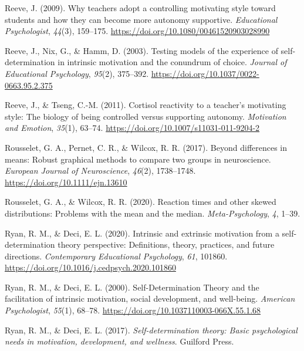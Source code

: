 \documentclass[
  man, donotrepeattitle,mask,floatsintext]{apa7}
\newlength{\cslhangindent}
\newlength{\cslentryspacingunit} %
\newenvironment{CSLReferences}[2] %
 {%
  \setlength{\parindent}{0pt}
  \ifodd #1
  \let\oldpar\par
  \def\par{\hangindent=\cslhangindent\oldpar}
  \fi
  \setlength{\parskip}{#2\cslentryspacingunit}
 }%
 {}
\begin{document}
\begin{CSLReferences}{1}{0}
\leavevmode{}%
Reeve, J. (2009). Why teachers adopt a controlling motivating style toward students and how they can become more autonomy supportive. \emph{Educational Psychologist}, \emph{44}(3), 159--175. \url{https://doi.org/10.1080/00461520903028990}

\leavevmode{}%
Reeve, J., Nix, G., \& Hamm, D. (2003). Testing models of the experience of self-determination in intrinsic motivation and the conundrum of choice. \emph{Journal of Educational Psychology}, \emph{95}(2), 375--392. \url{https://doi.org/10.1037/0022-0663.95.2.375}

\leavevmode{}%
Reeve, J., \& Tseng, C.-M. (2011). Cortisol reactivity to a teacher's motivating style: {The} biology of being controlled versus supporting autonomy. \emph{Motivation and Emotion}, \emph{35}(1), 63--74. \url{https://doi.org/10.1007/s11031-011-9204-2}

\leavevmode{}%
Rousselet, G. A., Pernet, C. R., \& Wilcox, R. R. (2017). Beyond differences in means: Robust graphical methods to compare two groups in neuroscience. \emph{European Journal of Neuroscience}, \emph{46}(2), 1738--1748. \url{https://doi.org/10.1111/ejn.13610}

\leavevmode{}%
Rousselet, G. A., \& Wilcox, R. R. (2020). Reaction times and other skewed distributions: Problems with the mean and the median. \emph{Meta-Psychology}, \emph{4}, 1--39.

\leavevmode{}%
Ryan, R. M., \& Deci, E. L. (2020). Intrinsic and extrinsic motivation from a self-determination theory perspective: {Definitions}, theory, practices, and future directions. \emph{Contemporary Educational Psychology}, \emph{61}, 101860. \url{https://doi.org/10.1016/j.cedpsych.2020.101860}

\leavevmode{}%
Ryan, R. M., \& Deci, E. L. (2000). Self-{Determination Theory} and the facilitation of intrinsic motivation, social development, and well-being. \emph{American Psychologist}, \emph{55}(1), 68--78. \url{https://doi.org/10.1037110003-066X.55.1.68}

\leavevmode{}%
Ryan, R. M., \& Deci, E. L. (2017). \emph{Self-determination theory: {Basic} psychological needs in motivation, development, and wellness}. {Guilford Press}.


\end{CSLReferences}
\end{document}

